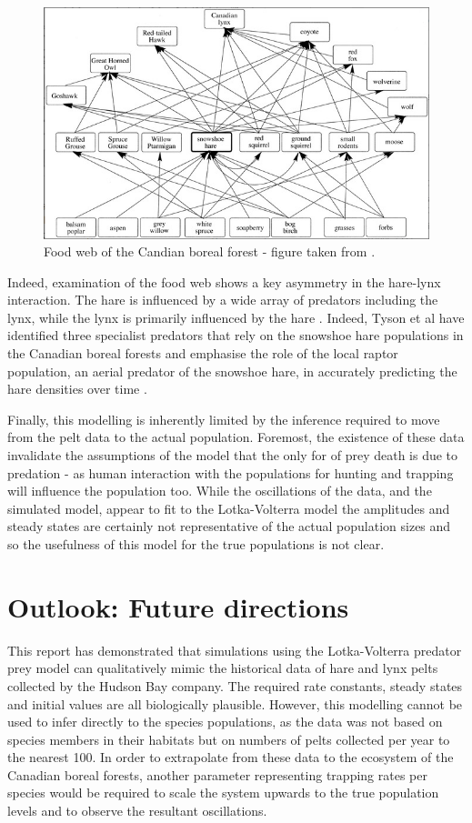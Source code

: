 \documentclass{article}
\begin{document}
\begin{figure}[H]
    \includegraphics[width = \textwidth]{food_web.PNG}
    \caption{Food web of the Candian boreal forest - figure taken from \parencite{king_geometry_2001}.}
    \label{fig:food_web}
\end{figure}

Indeed, examination of the food web shows a key asymmetry in the hare-lynx interaction. The hare is influenced by a wide array of predators including the lynx, while the lynx is primarily influenced by the hare \parencite{stenseth_population_1997}. Indeed, Tyson et al have identified three specialist predators that rely on the snowshoe hare populations in the Canadian boreal forests and emphasise the role of the local raptor population, an aerial predator of the snowshoe hare, in accurately predicting the hare densities over time \parencite{tyson_modelling_2010}. 

Finally, this modelling is inherently limited by the inference required to move from the pelt data to the actual population. Foremost, the existence of these data invalidate the assumptions of the model that the only for of prey death is due to predation - as human interaction with the populations for hunting and trapping will influence the population too. While the oscillations of the data, and the simulated model, appear to fit to the Lotka-Volterra model the amplitudes and steady states are certainly not representative of the actual population sizes and so the usefulness of this model for the true populations is not clear. 

\clearpage
\section{Outlook: Future directions}
This report has demonstrated that simulations using the Lotka-Volterra predator prey model can qualitatively mimic the historical data of hare and lynx pelts collected by the Hudson Bay company. The required rate constants, steady states and initial values are all biologically plausible. However, this modelling cannot be used to infer directly to the species populations, as the data was not based on species members in their habitats but on numbers of pelts collected per year to the nearest 100. In order to extrapolate from these data to the ecosystem of the Canadian boreal forests, another parameter representing trapping rates per species would be required to scale the system upwards to the true population levels and to observe the resultant oscillations.
\end{document}
